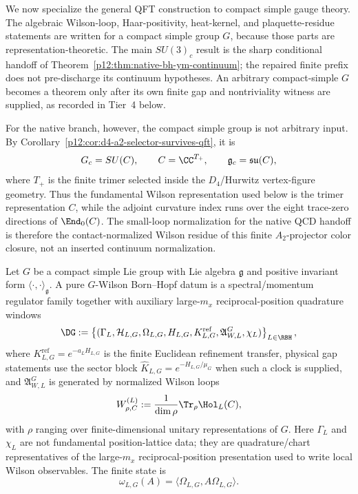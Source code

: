 \documentclass[12pt,a4paper]{article}
\begin{document}
We now specialize the general QFT construction to compact simple gauge theory.  The algebraic Wilson-loop, Haar-positivity, heat-kernel, and plaquette-residue statements are written for a compact simple group \(G\), because those parts are representation-theoretic.  The main \(SU(3)_c\) result is the sharp conditional handoff of Theorem~\ref{p12:thm:native-bh-ym-continuum}; the repaired finite prefix does not pre-discharge its continuum hypotheses.  An arbitrary compact-simple \(G\) becomes a theorem only after its own finite gap and nontriviality witness are supplied, as recorded in Tier~4 below.

For the native branch, however, the compact simple group is not arbitrary
input.  By Corollary~\ref{p12:cor:d4-a2-selector-survives-qft}, it is
\[
G_c=SU(C),
\qquad
C=\CC^{T_+},
\qquad
\mathfrak g_c=\mathfrak{su}(C),
\]
where \(T_+\) is the finite trimer selected inside the \(D_4\)/Hurwitz
vertex-figure geometry.  Thus the fundamental Wilson representation used
below is the trimer representation \(C\), while the adjoint curvature index
runs over the eight trace-zero directions of \(\End_0(C)\).  The small-loop
normalization for the native QCD handoff is therefore the contact-normalized
Wilson residue of this finite \(A_2\)-projector color closure, not an inserted
continuum normalization.

\begin{definition}
\label{p12:def:pure-g-wilson-datum}
Let \(G\) be a compact simple Lie group with Lie algebra \(\mathfrak g\) and positive invariant form \(\langle\cdot,\cdot\rangle_{\mathfrak g}\).  A pure \(G\)-Wilson Born--Hopf datum is a spectral/momentum regulator family together with auxiliary large-\(m_x\) reciprocal-position quadrature windows
\begin{equation}
\label{p12:eq:pure-g-datum}
\DG
:=
\left\{
(\Gamma_L,\mathcal H_{L,G},\Omega_{L,G},H_{L,G},K^{\mathrm{ref}}_{L,G},\mathfrak A_{W,L}^G,\chi_L)
\right\}_{L\in\RBH},
\end{equation}
where \(K^{\mathrm{ref}}_{L,G}=e^{-a_LH_{L,G}}\) is the finite Euclidean refinement transfer, physical gap statements use the sector block \(\widehat K_{L,G}=e^{-H_{L,G}/\mu_G}\) when such a clock is supplied, and \(\mathfrak A_{W,L}^G\) is generated by normalized Wilson loops
\begin{equation}
\label{p12:eq:normalized-wilson-loop}
W_{\rho,C}^{(L)}
:=
\frac1{\dim\rho}\Tr_{\rho}\Hol_L(C),
\end{equation}
with \(\rho\) ranging over finite-dimensional unitary representations of \(G\).  Here \(\Gamma_L\) and \(\chi_L\) are not fundamental position-lattice data; they are quadrature/chart representatives of the large-\(m_x\) reciprocal-position presentation used to write local Wilson observables.  The finite state is
\begin{equation}
\label{p12:eq:finite-wilson-state}
\omega_{L,G}(A)=\langle\Omega_{L,G},A\Omega_{L,G}\rangle .
\end{equation}
\end{definition}
\end{document}
